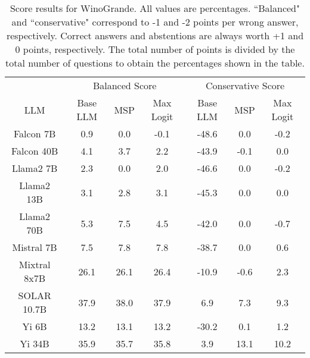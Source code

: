 \begin{table*}
\centering
\begin{tabular}{c|c|c|c|c|c|c}
& \multicolumn{3}{c|}{Balanced Score} & \multicolumn{3}{c}{Conservative Score} \\ 
LLM & Base LLM & MSP & Max Logit & Base LLM & MSP & Max Logit\\ \hline
Falcon 7B & 0.9 & 0.0 & -0.1 & -48.6 & 0.0 & -0.2\\
Falcon 40B & 4.1 & 3.7 & 2.2 & -43.9 & -0.1 & 0.0\\
Llama2 7B & 2.3 & 0.0 & 2.0 & -46.6 & 0.0 & -0.2\\
Llama2 13B & 3.1 & 2.8 & 3.1 & -45.3 & 0.0 & 0.0\\
Llama2 70B & 5.3 & 7.5 & 4.5 & -42.0 & 0.0 & -0.7\\
Mistral 7B & 7.5 & 7.8 & 7.8 & -38.7 & 0.0 & 0.6\\
Mixtral 8x7B & 26.1 & 26.1 & 26.4 & -10.9 & -0.6 & 2.3\\
SOLAR 10.7B & 37.9 & 38.0 & 37.9 & 6.9 & 7.3 & 9.3\\
Yi 6B & 13.2 & 13.1 & 13.2 & -30.2 & 0.1 & 1.2\\
Yi 34B & 35.9 & 35.7 & 35.8 & 3.9 & 13.1 & 10.2\\
\hline
\end{tabular}
\caption{Score results for WinoGrande. All values are percentages. ``Balanced" and ``conservative" correspond to -1 and -2 points per wrong answer, respectively. Correct answers and abstentions are always worth +1 and 0 points, respectively. The total number of points is divided by the total number of questions to obtain the percentages shown in the table.}
\label{tab:winogrande_score}
\end{table*}
